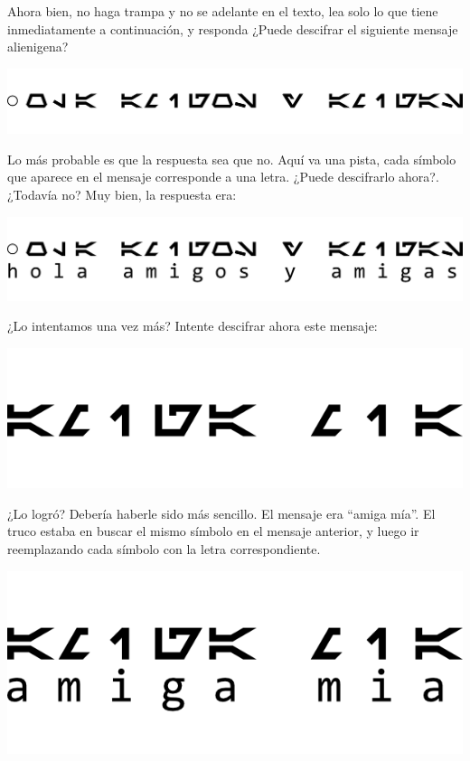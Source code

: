 Ahora bien, no haga trampa y no se adelante en el texto, lea solo lo que tiene
inmediatamente a continuación, y responda ¿Puede descifrar el siguiente mensaje alienigena?

\centerline{\includegraphics[]{capitulos/bajo_nivel/imagenes/secret_message_A1.png}}

Lo más probable es que la respuesta sea que no. Aquí va una pista, cada
símbolo que aparece en el mensaje corresponde a una letra. ¿Puede descifrarlo
ahora?. ¿Todavía no? Muy bien, la respuesta era:

\centerline{\includegraphics[]{capitulos/bajo_nivel/imagenes/secret_message_A2.png}}

¿Lo intentamos una vez más? Intente descifrar ahora este mensaje:

\centerline{\includegraphics[]{capitulos/bajo_nivel/imagenes/secret_message_B1.png}}

¿Lo logró? Debería haberle sido más sencillo. El mensaje era ``amiga mía''. El
truco estaba en buscar el mismo símbolo en el mensaje anterior, y luego ir
reemplazando cada símbolo con la letra correspondiente.

\centerline{\includegraphics[]{capitulos/bajo_nivel/imagenes/secret_message_B2.png}}

